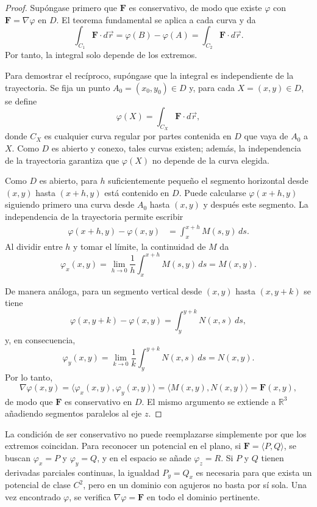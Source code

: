 \begin{proof}
Supóngase primero que $\mathbf{F}$ es conservativo, de modo que existe $\varphi$ con $\mathbf{F}=\nabla\varphi$ en $D$. El teorema fundamental se aplica a cada curva y da
\[
\int_{C_1}\mathbf{F}\cdot d\vec r
=\varphi(B)-\varphi(A)
=\int_{C_2}\mathbf{F}\cdot d\vec r.
\]
Por tanto, la integral solo depende de los extremos.

Para demostrar el recíproco, supóngase que la integral es independiente de la trayectoria. Se fija un punto $A_0=(x_0,y_0)\in D$ y, para cada $X=(x,y)\in D$, se define
\[
\varphi(X)=\int_{C_X}\mathbf{F}\cdot d\vec r,
\]
donde $C_X$ es cualquier curva regular por partes contenida en $D$ que vaya de $A_0$ a $X$. Como $D$ es abierto y conexo, tales curvas existen; además, la independencia de la trayectoria garantiza que $\varphi(X)$ no depende de la curva elegida.

Como $D$ es abierto, para $h$ suficientemente pequeño el segmento horizontal desde $(x,y)$ hasta $(x+h,y)$ está contenido en $D$. Puede calcularse $\varphi(x+h,y)$ siguiendo primero una curva desde $A_0$ hasta $(x,y)$ y después este segmento. La independencia de la trayectoria permite escribir
\begin{align*}
\varphi(x+h,y)-\varphi(x,y)
&=\int_x^{x+h}M(s,y)\,ds.
\end{align*}
Al dividir entre $h$ y tomar el límite, la continuidad de $M$ da
\[
\varphi_x(x,y)
=\lim_{h\to0}\frac{1}{h}\int_x^{x+h}M(s,y)\,ds
=M(x,y).
\]

De manera análoga, para un segmento vertical desde $(x,y)$ hasta $(x,y+k)$ se tiene
\[
\varphi(x,y+k)-\varphi(x,y)
=\int_y^{y+k}N(x,s)\,ds,
\]
y, en consecuencia,
\[
\varphi_y(x,y)
=\lim_{k\to0}\frac{1}{k}\int_y^{y+k}N(x,s)\,ds
=N(x,y).
\]
Por lo tanto,
\[
\nabla\varphi(x,y)
=\langle\varphi_x(x,y),\varphi_y(x,y)\rangle
=\langle M(x,y),N(x,y)\rangle
=\mathbf{F}(x,y),
\]
de modo que $\mathbf{F}$ es conservativo en $D$. El mismo argumento se extiende a $\mathbb R^3$ añadiendo segmentos paralelos al eje $z$.
\end{proof}

La condición de ser conservativo no puede reemplazarse simplemente por que los extremos coincidan. Para reconocer un potencial en el plano, si $\mathbf{F}=\langle P,Q\rangle$, se buscan $\varphi_x=P$ y $\varphi_y=Q$, y en el espacio se añade $\varphi_z=R$. Si $P$ y $Q$ tienen derivadas parciales continuas, la igualdad $P_y=Q_x$ es necesaria para que exista un potencial de clase $C^2$, pero en un dominio con agujeros no basta por sí sola. Una vez encontrado $\varphi$, se verifica $\nabla\varphi=\mathbf{F}$ en todo el dominio pertinente.


